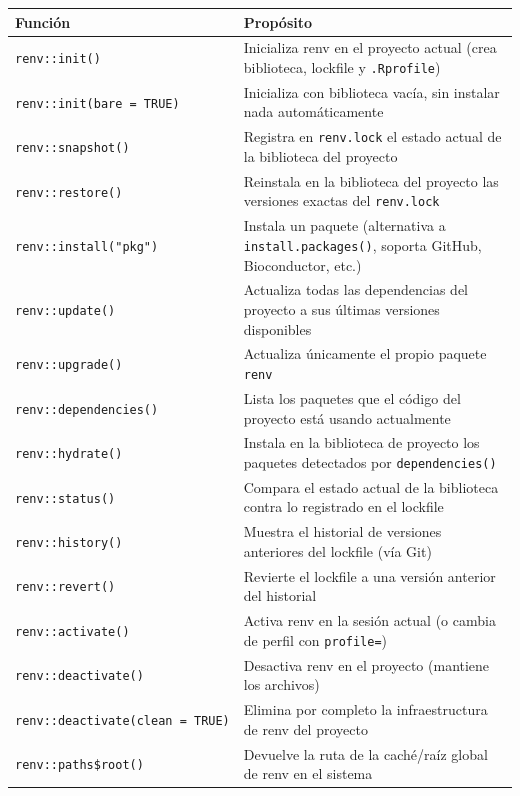 \documentclass[
  man,
  floatsintext,
  longtable,
  a4paper,
  nolmodern,
  notxfonts,
  notimes,
  12pt,
  colorlinks=true,linkcolor=blue,citecolor=blue,urlcolor=blue]{apa7}
\newcounter{none} %
\begin{document}
{\def\LTcaptype{none} %
\begin{longtable}[]{@{}
  >{\raggedright\arraybackslash}p{}
  >{\raggedright\arraybackslash}p{}@{}}
\toprule\noalign{}
\begin{minipage}[b]{\linewidth}\raggedright
Función
\end{minipage} & \begin{minipage}[b]{\linewidth}\raggedright
Propósito
\end{minipage} \\
\midrule\noalign{}
\endhead
\bottomrule\noalign{}
\endlastfoot
\texttt{renv::init()} & Inicializa renv en el proyecto actual (crea
biblioteca, lockfile y \texttt{.Rprofile}) \\
\texttt{renv::init(bare\ =\ TRUE)} & Inicializa con biblioteca vacía,
sin instalar nada automáticamente \\
\texttt{renv::snapshot()} & Registra en \texttt{renv.lock} el estado
actual de la biblioteca del proyecto \\
\texttt{renv::restore()} & Reinstala en la biblioteca del proyecto las
versiones exactas del \texttt{renv.lock} \\
\texttt{renv::install("pkg")} & Instala un paquete (alternativa a
\texttt{install.packages()}, soporta GitHub, Bioconductor, etc.) \\
\texttt{renv::update()} & Actualiza todas las dependencias del proyecto
a sus últimas versiones disponibles \\
\texttt{renv::upgrade()} & Actualiza únicamente el propio paquete
\texttt{renv} \\
\texttt{renv::dependencies()} & Lista los paquetes que el código del
proyecto está usando actualmente \\
\texttt{renv::hydrate()} & Instala en la biblioteca de proyecto los
paquetes detectados por \texttt{dependencies()} \\
\texttt{renv::status()} & Compara el estado actual de la biblioteca
contra lo registrado en el lockfile \\
\texttt{renv::history()} & Muestra el historial de versiones anteriores
del lockfile (vía Git) \\
\texttt{renv::revert()} & Revierte el lockfile a una versión anterior
del historial \\
\texttt{renv::activate()} & Activa renv en la sesión actual (o cambia de
perfil con \texttt{profile=}) \\
\texttt{renv::deactivate()} & Desactiva renv en el proyecto (mantiene
los archivos) \\
\texttt{renv::deactivate(clean\ =\ TRUE)} & Elimina por completo la
infraestructura de renv del proyecto \\
\texttt{renv::paths\$root()} & Devuelve la ruta de la caché/raíz global
de renv en el sistema \\
\end{longtable}
}
\end{document}

